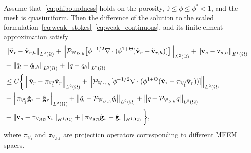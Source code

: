 \documentclass[usenames,dvipsnames,letterpaper,landscape,final]{slides}
\begin{document}
\begin{myslide}

\begin{lemma}
Assume that~\eqref{eq:phiboundness} holds on the porosity, $0\leq \phi \leq \phi^* <1$, and the mesh
is quasiuniform. Then the difference of the solution to the scaled formulation~\eqref{eq:weak_stokes}--\eqref{eq:weak_continuous},
and its finite elment approximation satisfy
\begin{equation}
\begin{aligned}
&\left\lVert\tilde{\mathbf{v}}_r - \tilde{\mathbf{v}}_{r,h}\right\rVert_{L^2(\Omega)} + 
\left\lVert\mathcal{P}_{\mathbb{W}_{D,h}}\big[\phi^{-1/2}\nabla \cdot(\phi^{1+\Theta}(\tilde{\mathbf{v}}_r - \tilde{\mathbf{v}}_{r,h})
)\big]\right\rVert_{L^{2}(\Omega)} + \left\lVert\mathbf{v}_s - \mathbf{v}_{s,h}\right\rVert_{H^1(\Omega)} \\
&+ \left\lVert\tilde{q}_l - \tilde{q}_{l,h}\right\rVert_{L^2(\Omega)} + \left\lVert q - q_h\right\rVert_{L^2(\Omega)} \\
&\leq C \bigg\{\left\lVert\tilde{\mathbf{v}}_r - \pi_{\mathbb{V}_1^0} \tilde{\mathbf{v}}_r\right\rVert_{L^2(\Omega)}  + 
\left\lVert\mathcal{P}_{\mathbb{W}_{D.h}}[\phi^{-1/2}\nabla\cdot(\phi^{1+\Theta}(\tilde{\mathbf{v}}_r - \pi_{\mathbb{V}_1^0}\tilde{\mathbf{v}}_r))]\right\rVert_{L^2(\Omega)}  \\
&+\left\lVert\pi_{\mathbb{V}_1^0}\tilde{\mathbf{g}}_r - \hat{\mathbf{g}}_r\right\rVert_{L^2(\Omega)} + 
\left\lVert\tilde{q}_l - \mathcal{P}_{\mathbb{W}_{D,h}}\tilde{q}_l\right\rVert_{L^2(\Omega)} + \left\lVert q - \mathcal{P}_{\mathbb{W}_{S,h}}q\right\rVert_{L^2(\Omega)}\\ 
&+ \left\lVert\mathbf{v}_s - \pi_{\mathbb{V}_\mathcal{BR}}\mathbf{v}_s\right\rVert_{H^1(\Omega)} + \left\lVert\pi_{\mathbb{V}_\mathcal{BR}}\tilde{\mathbf{g}}_s - \hat{\mathbf{g}}_s \right\rVert_{H^1(\Omega)} \bigg\},
\end{aligned}
\end{equation}
where $\pi_{\mathbb{V}_{1}^0}$ and $\pi_{\mathbb{V}_\mathcal{BR}}$ are projection operators corresponding to different MFEM spaces.
\end{lemma}

\end{myslide}
\end{document}
